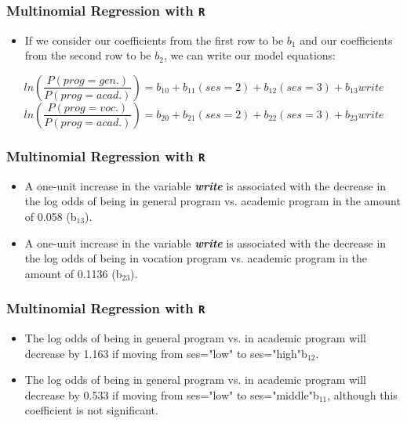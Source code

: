 \documentclass[00-GLMregslides.tex]{subfiles}
\begin{document}
\begin{frame}[fragile]
\frametitle{Multinomial Regression with \texttt{R}}
\Large
\begin{itemize}
\item If we consider our coefficients from the first row to be $b_1$ and our coefficients from the second row to be $b_2$, we can write our model equations:
\end{itemize}
{\normalsize
	
	\hspace{-0.95cm} \[ ln\left(\frac{P(prog=gen.)}{P(prog=acad.)}\right) = b_{10} + b_{11}(ses=2) + b_{12}(ses=3) + b_{13}write \] \[ ln\left(\frac{P(prog=voc.)}{P(prog=acad.)}\right) = b_{20} + b_{21}(ses=2) + b_{22}(ses=3) + b_{23}write \] 
}

\end{frame}
\begin{frame}[fragile]
	
	\frametitle{Multinomial Regression with \texttt{R}}
	\Large
	\begin{itemize}

\item A one-unit increase in the variable \textbf{\textit{write}} is associated with the decrease in the log odds of being in general program vs. academic program in the amount of 0.058 (b$_{13}$).
\item A one-unit increase in the variable \textbf{\textit{write}} is associated with the decrease 
in the log odds of being in vocation program vs. academic program in the amount of 0.1136 (b$_{23}$).
\end{itemize}
\end{frame}
\begin{frame}[fragile]

\frametitle{Multinomial Regression with \texttt{R}}
\Large
\begin{itemize}
\item The log odds of being in general program vs. in academic program will decrease by 
1.163 if moving from ses="low" to ses="high"b$_{12}$.
\item The log odds of being in general program vs. in academic 
program will decrease by 0.533 if moving from ses="low" to ses="middle"b$_{11}$, 
although this coefficient is not significant.
\end{itemize}
\end{frame}
\end{document}
